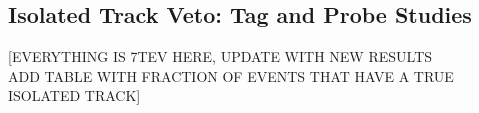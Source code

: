 

\subsection{Isolated Track Veto: Tag and Probe Studies}

[EVERYTHING IS 7TEV HERE, UPDATE WITH NEW RESULTS \\
ADD TABLE WITH FRACTION OF EVENTS THAT HAVE A TRUE ISOLATED TRACK]

